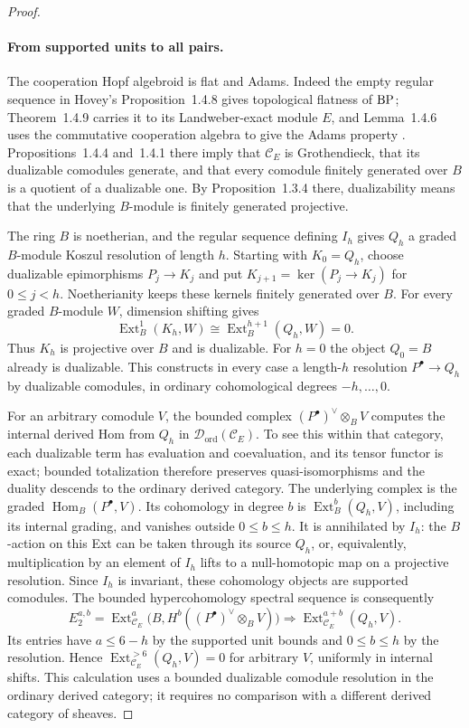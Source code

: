 \begin{proof}
\paragraph{From supported units to all pairs.}
The cooperation Hopf algebroid is flat and Adams. Indeed the empty
regular sequence in Hovey's Proposition~1.4.8 gives topological
flatness of $\mathrm{BP}$; Theorem~1.4.9 carries it to its Landweber-exact
module $E$, and Lemma~1.4.6 uses the commutative cooperation algebra
to give the Adams property \cite{Hovey2004}. Propositions~1.4.4
and~1.4.1 there imply that $\mathscr C_E$ is Grothendieck, that its
dualizable comodules generate, and that every comodule finitely
generated over $B$ is a quotient of a dualizable one. By
Proposition~1.3.4 there, dualizability means that the underlying
$B$-module is finitely generated projective.

The ring $B$ is noetherian, and the regular sequence defining $I_h$
gives $Q_h$ a graded $B$-module Koszul resolution of length $h$.
Starting with $K_0=Q_h$, choose dualizable epimorphisms
$P_j\to K_j$ and put $K_{j+1}=\ker(P_j\to K_j)$ for $0\leq j<h$.
Noetherianity keeps these kernels finitely generated over $B$.
For every graded $B$-module $W$, dimension shifting gives
\[
 \operatorname{Ext}^1_B(K_h,W)
 \cong\operatorname{Ext}^{h+1}_B(Q_h,W)=0.
\]
Thus $K_h$ is projective over $B$ and is dualizable. For $h=0$ the
object $Q_0=B$ already is dualizable. This constructs in every case
a length-$h$ resolution $P^\bullet\to Q_h$ by dualizable comodules,
in ordinary cohomological degrees $-h,\ldots,0$.

For an arbitrary comodule $V$, the bounded complex
$(P^\bullet)^\vee\otimes_B V$ computes the internal derived Hom from
$Q_h$ in $\mathcal D_{\mathrm{ord}}(\mathscr C_E)$. To see this within
that category, each dualizable term has evaluation and coevaluation,
and its tensor functor is exact; bounded totalization therefore
preserves quasi-isomorphisms and the duality descends to the ordinary
derived category. The underlying complex is the graded
$\operatorname{Hom}_B(P^\bullet,V)$. Its cohomology in degree $b$ is
$\operatorname{Ext}^b_B(Q_h,V)$, including its internal grading, and
vanishes outside $0\leq b\leq h$. It is annihilated by $I_h$: the
$B$-action on this Ext can be taken through its source $Q_h$, or,
equivalently, multiplication by an element of $I_h$ lifts to a
null-homotopic map on a projective resolution. Since $I_h$ is
invariant, these cohomology objects are supported comodules. The
bounded hypercohomology spectral sequence is consequently
\[
 E_2^{a,b}=\operatorname{Ext}_{\mathscr C_E}^{a}
   \bigl(B,H^b((P^\bullet)^\vee\otimes_B V)\bigr)
 \Longrightarrow \operatorname{Ext}_{\mathscr C_E}^{a+b}(Q_h,V).
\]
Its entries have $a\leq6-h$ by the supported unit bounds and
$0\leq b\leq h$ by the resolution. Hence
$\operatorname{Ext}^{>6}_{\mathscr C_E}(Q_h,V)=0$ for arbitrary $V$,
uniformly in internal shifts. This calculation uses a bounded
dualizable comodule resolution in the ordinary derived category; it
requires no comparison with a different derived category of sheaves.


\end{proof}
